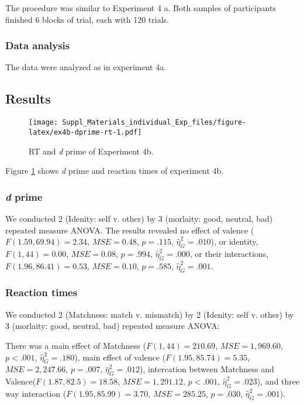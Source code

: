 \documentclass[man]{apa6}
\begin{document}
The procedure was similar to Experiment 4 a. Both samples of participants finished 6 blocks of trial, each with 120 trials.

\hypertarget{data-analysis-6}{%
\subsubsection{Data analysis}\label{data-analysis-6}}

The data were analyzed as in experiment 4a.

\hypertarget{results-7}{%
\subsection{Results}\label{results-7}}

\begin{figure}
\centering
\texttt{[image: Suppl\_Materials\_individual\_Exp\_files/figure-latex/ex4b-dprime-rt-1.pdf]}
\caption{\label{fig:ex4b-dprime-rt}RT and \emph{d} prime of Experiment 4b.}
\end{figure}

Figure \ref{fig:ex4b-dprime-rt} shows \emph{d} prime and reaction times of experiment 4b.

\hypertarget{d-prime-4}{%
\subsubsection{\texorpdfstring{\emph{d} prime}{d prime}}\label{d-prime-4}}

We conducted 2 (Idenity: self v. other) by 3 (morlaity: good, neutral, bad) repeated measure ANOVA. The results revealed no effect of valence (\(F(1.59, 69.94) = 2.34\), \(\mathit{MSE} = 0.48\), \(p = .115\), \(\hat{\eta}^2_G = .010\)), or identity, \(F(1, 44) = 0.00\), \(\mathit{MSE} = 0.08\), \(p = .994\), \(\hat{\eta}^2_G = .000\), or their interactions, \(F(1.96, 86.41) = 0.53\), \(\mathit{MSE} = 0.10\), \(p = .585\), \(\hat{\eta}^2_G = .001\).

\hypertarget{reaction-times-1}{%
\subsubsection{Reaction times}\label{reaction-times-1}}

We conducted 2 (Matchness: match v. mismatch) by 2 (Idenity: self v. other) by 3 (morlaity: good, neutral, bad) repeated measure ANOVA:

There was a main effect of Matchness (\(F(1, 44) = 210.69\), \(\mathit{MSE} = 1,969.60\), \(p < .001\), \(\hat{\eta}^2_G = .180\)), main effect of valence (\(F(1.95, 85.74) = 5.35\), \(\mathit{MSE} = 2,247.66\), \(p = .007\), \(\hat{\eta}^2_G = .012\)), intercation between Matchness and Valence(\(F(1.87, 82.5) = 18.58\), \(\mathit{MSE} = 1,291.12\), \(p < .001\), \(\hat{\eta}^2_G = .023\)), and three way interaction (\(F(1.95, 85.99) = 3.70\), \(\mathit{MSE} = 285.25\), \(p = .030\), \(\hat{\eta}^2_G = .001\)).
\end{document}
